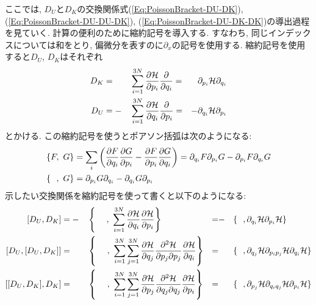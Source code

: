 ここでは, $D_{U}$と$D_{K}$の交換関係式(\ref{Eq:PoissonBracket-DU-DK}), (\ref{Eq:PoissonBracket-DU-DU-DK}), (\ref{Eq:PoissonBracket-DU-DK-DK})の導出過程を見ていく.
計算の便利のために縮約記号を導入する.
すなわち, 同じインデックスについては和をとり, 偏微分を表すのに$\partial_{x}$の記号を使用する. 縮約記号を使用すると$D_{U}$, $D_{K}$はそれぞれ
\begin{alignat}{4}
  D_{K}
  &= &&
  \sum_{i=1}^{3N}
  \frac{\partial \mathcal{H}}{\partial p_{i}}
  \frac{\partial}{\partial q_{i}}
  =&
  \partial_{p_{i}} \mathcal{H} \partial_{q_{i}}
  \notag \\
  D_{U}
  &= -&&
  \sum_{i=1}^{3N}
  \frac{\partial \mathcal{H}}{\partial q_{i}}
  \frac{\partial}{\partial p_{i}}
  =&
  -
  \partial_{q_{i}} \mathcal{H} \partial_{p_{i}}
  \notag
\end{alignat}
とかける.
この縮約記号を使うとポアソン括弧は次のようになる:
\begin{align}
  \left\{
    F,~G
  \right\}
  &=
  \sum_{i}
  \left(
    \frac{\partial F}{\partial q_{i}}
    \frac{\partial G}{\partial p_{i}}
    -
    \frac{\partial F}{\partial p_{i}}
    \frac{\partial G}{\partial q_{i}}
  \right)
  =
  \partial_{q_{i}} F \partial_{p_{i}} G
  -
  \partial_{p_{i}} F \partial_{q_{i}} G
  \notag \\
  \left\{
    ~~,~G
  \right\}
  &=
  \partial_{p_{i}} G
  \partial_{q_{i}}
  -
  \partial_{q_{i}} G
  \partial_{p_{i}}
  \notag
\end{align}
示したい交換関係を縮約記号を使って書くと以下のようになる:
\begin{alignat}{4}
  [D_{U}, D_{K}]
  &=
  -&&
  \left\{
    ~~~~,~
    \sum_{i=1}^{3N}
    \frac{\partial \mathcal{H}}{\partial q_{i}}
    \frac{\partial \mathcal{H}}{\partial p_{i}}
  \right\}
  &=&- &&
  \{~~,
    \partial_{q_{i}} \mathcal{H}
    \partial_{p_{i}} \mathcal{H}
  \}
  \notag \\
  [D_{U}, [D_{U}, D_{K}]]
  &=&&
  \left\{
    ~~~~,~
    \sum_{i=1}^{3N} \sum_{j=1}^{3N}
    \frac{\partial \mathcal{H}}{\partial q_{j}}
    \frac{\partial^{2} \mathcal{H}}{\partial p_{j} \partial p_{j}}
    \frac{\partial \mathcal{H}}{\partial q_{i}}
  \right\}
  &=& &&
  \{~~,
    \partial_{q_{j}}       \mathcal{H}
    \partial_{p_{i} p_{j}} \mathcal{H}
    \partial_{q_{i}}       \mathcal{H}
  \}
  \notag \\
  [[D_{U}, D_{K}], D_{K}]
  &=&&
  \left\{
    ~~~~,~
    \sum_{i=1}^{3N} \sum_{j=1}^{3N}
    \frac{\partial \mathcal{H}}{\partial p_{j}}
    \frac{\partial^{2} \mathcal{H}}{\partial q_{j} \partial q_{j}}
    \frac{\partial \mathcal{H}}{\partial p_{i}}
  \right\}
  &=& &&
  \{~~,
    \partial_{p_{j}}       \mathcal{H}
    \partial_{q_{i} q_{j}} \mathcal{H}
    \partial_{p_{i}}       \mathcal{H}
  \}
  \notag
\end{alignat}

